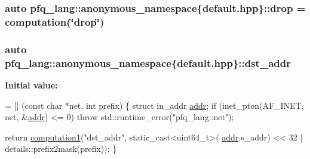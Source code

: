 \hypertarget{namespacepfq__lang_1_1anonymous__namespace_02default_8hpp_03_abed0412f2864624f755594077d255b1e}{
\subsubsection[{drop}]{\setlength{\rightskip}{0pt plus 5cm}auto pfq\-\_\-lang\-::anonymous\-\_\-namespace\{default.\-hpp\}\-::drop = {\bf computation}(\char`\"{}drop\char`\"{})}}\label{namespacepfq__lang_1_1anonymous__namespace_02default_8hpp_03_abed0412f2864624f755594077d255b1e}
\hypertarget{namespacepfq__lang_1_1anonymous__namespace_02default_8hpp_03_a4b72bac7c3af312ffe7c670eb2583f9a}{
\subsubsection[{dst\-\_\-addr}]{\setlength{\rightskip}{0pt plus 5cm}auto pfq\-\_\-lang\-::anonymous\-\_\-namespace\{default.\-hpp\}\-::dst\-\_\-addr}}\label{namespacepfq__lang_1_1anonymous__namespace_02default_8hpp_03_a4b72bac7c3af312ffe7c670eb2583f9a}
{\bfseries Initial value\-:}
\begin{DoxyCode}
= [] (\textcolor{keyword}{const} \textcolor{keywordtype}{char} *net, \textcolor{keywordtype}{int} prefix)
        \{
            \textcolor{keyword}{struct }in\_addr \hyperlink{namespacepfq__lang_1_1anonymous__namespace_02default_8hpp_03_aafce8334d1be83bff9a2115439c8c453}{addr};
            \textcolor{keywordflow}{if} (inet\_pton(AF\_INET, net, &\hyperlink{namespacepfq__lang_1_1anonymous__namespace_02default_8hpp_03_aafce8334d1be83bff9a2115439c8c453}{addr}) <= 0)
                \textcolor{keywordflow}{throw} std::runtime\_error(\textcolor{stringliteral}{"pfq\_lang::net"});

            \textcolor{keywordflow}{return} \hyperlink{namespacepfq__lang_a58e7e358fc7c95121f74d56c094b1627}{computation1}(\textcolor{stringliteral}{"dst\_addr"}, static\_cast<uint64\_t>(
      \hyperlink{namespacepfq__lang_1_1anonymous__namespace_02default_8hpp_03_aafce8334d1be83bff9a2115439c8c453}{addr}.s\_addr) << 32 | details::prefix2mask(prefix));
        \}
\end{DoxyCode}
